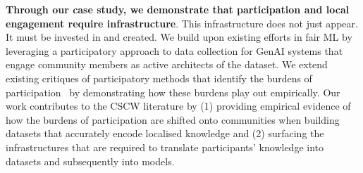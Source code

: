 \textbf{Through our case study, we demonstrate that participation and local engagement require infrastructure}. This infrastructure does not just appear. It must be invested in and created. We build upon existing efforts in fair ML by leveraging a participatory approach to data collection for GenAI systems that engage community members as active architects of the dataset. We extend existing critiques of participatory methods that identify the burdens of participation~\cite{pierre2021getting,birhanePowerPeopleOpportunities2022} by demonstrating how these burdens play out empirically. Our work contributes to the CSCW literature by (1) providing empirical evidence of how the burdens of participation are shifted onto communities when building datasets that accurately encode localised knowledge and (2) surfacing the infrastructures that are required to translate participants' knowledge into datasets and subsequently into models. 

